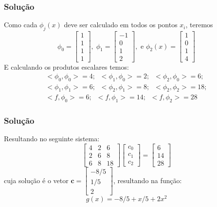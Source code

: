 \documentclass{beamer}
\theoremstyle{mystyle}
\begin{document}
	\begin{frame}
		\frametitle{Solução}
		Como cada $ \phi_{j}(x) $ deve ser calculado em todos os pontos $ x_{i} $, teremos 
		\begin{equation*}
			\phi_{0} = \left[ \begin{array}{c}
				1\\
				1\\
				1\\
				1
			\end{array} \right],\; \phi_{1} = \left[ \begin{array}{c}
				-1\\
				0\\
				1\\
				2
			\end{array} \right], \mbox{ e } \phi_{2}(x) = \left[ \begin{array}{c}
				1\\
				0\\
				1\\
				4
			\end{array} \right]
		\end{equation*}
		E calculando os produtos escalares temos:
		\begin{gather*}
			<\phi_{0},\phi_{0}> = 4;\;\; <\phi_{1},\phi_{0}> = 2;\;\; <\phi_{2},\phi_{0}> = 6;\\
			<\phi_{1},\phi_{1}> = 6;\;\; <\phi_{2},\phi_{1}> = 8;\;\; <\phi_{2},\phi_{2}> = 18;\\
			<f,\phi_{0}> = 6;\;\; <f,\phi_{1}> = 14;\;\; <f,\phi_{2}> =28
		\end{gather*}
	\end{frame}
	
	\begin{frame}
		\frametitle{Solução}
		Resultando no seguinte sistema:
		\begin{equation*}
			\left[ \begin{array}{ccc}
				4 & 2 & 6 \\
				2 & 6 & 8 \\
				6 & 8 & 18
			\end{array}\right]
			\left[ \begin{array}{c}
				c_{0}\\
				c_{1}\\
				c_{2}
			\end{array} \right]
			= \left[ \begin{array}{c}
				6\\
				14\\
				28
			\end{array} \right]
		\end{equation*}
		cuja solução é o vetor $ \mathbf{c} = \left[ \begin{array}{c}
			-8/5\\
			1/5\\
			2
		\end{array} \right]  $, resultando na função:
		\begin{equation*}
			g(x) = -8/5 + x/5 + 2x^{2}
		\end{equation*}
	\end{frame}
\end{document}
